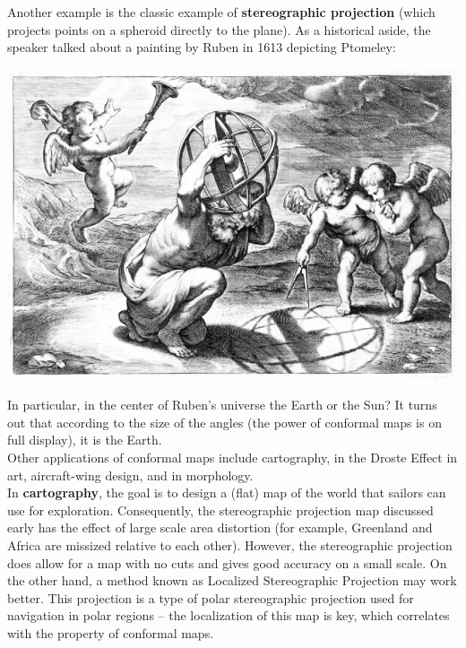 \documentclass[12pt]{amsart}
\begin{document}
Another example is the classic example of \textbf{stereographic projection} (which projects points on a spheroid directly to the plane). As a historical aside, the speaker talked about a painting by Ruben in 1613 depicting Ptomeley: \\

\begin{center}
\includegraphics[scale = 0.35]{note_imgs/ruben_ptolemy.png}
\end{center}

In particular, in the center of Ruben's universe the Earth or the Sun? It turns out that according to the size of the angles (the power of conformal maps is on full display), it is the Earth. \\ 

Other applications of conformal maps include cartography, in the Droste Effect in art, aircraft-wing design, and in morphology. \\

In \textbf{cartography}, the goal is to design a (flat) map of the world that sailors can use for exploration. 
Consequently, the stereographic projection map discussed early has the effect of large scale area distortion (for example, Greenland and Africa are missized relative to each other). However, the stereographic projection does allow for a map with no cuts and gives good accuracy on a small scale. 
On the other hand, a method known as Localized Stereographic Projection may work better. This projection is a type of polar stereographic projection used for navigation in polar regions -- the localization of this map is key, which correlates with the property of conformal maps. \\
\end{document}
